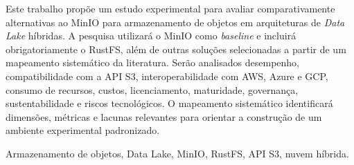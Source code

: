 Este trabalho propõe um estudo experimental para avaliar comparativamente
alternativas ao MinIO para armazenamento de objetos em arquiteturas de
\textit{Data Lake} híbridas. A pesquisa utilizará o MinIO como \textit{baseline}
e incluirá obrigatoriamente o RustFS, além de outras soluções selecionadas a
partir de um mapeamento sistemático da literatura. Serão analisados desempenho,
compatibilidade com a API S3, interoperabilidade com AWS, Azure e GCP, consumo de
recursos, custos, licenciamento, maturidade, governança, sustentabilidade e riscos
tecnológicos. O mapeamento sistemático identificará dimensões, métricas e lacunas
relevantes para orientar a construção de um ambiente experimental padronizado.

\begin{keywords}
Armazenamento de objetos, Data Lake, MinIO, RustFS, API S3, nuvem híbrida.
\end{keywords}

